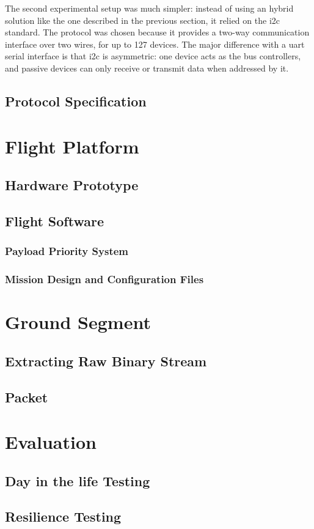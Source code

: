 The second experimental setup was much simpler: instead of using an hybrid
solution like the one described in the previous section, it relied on the
\acrshort{i2c} standard. The protocol was chosen because it provides a two-way
communication interface over two wires, for up to 127 devices. The major
difference with a \acrshort{uart} serial interface is that \acrshort{i2c} is
asymmetric: one device acts as the bus controllers, and passive devices can
only receive or transmit data when addressed by it.

\subsection{Protocol Specification}


\section{Flight Platform}
\label{sec:flight-software}

\subsection{Hardware Prototype}

\subsection{Flight Software}

\subsubsection{Payload Priority System}

\subsubsection{Mission Design and Configuration Files}

\section{Ground Segment}
\label{sec:ground-segment}

\subsection{Extracting Raw Binary Stream}

\subsection{Packet}

\section{Evaluation}
\label{sec:testing}

\subsection{Day in the life Testing}

\subsection{Resilience Testing}